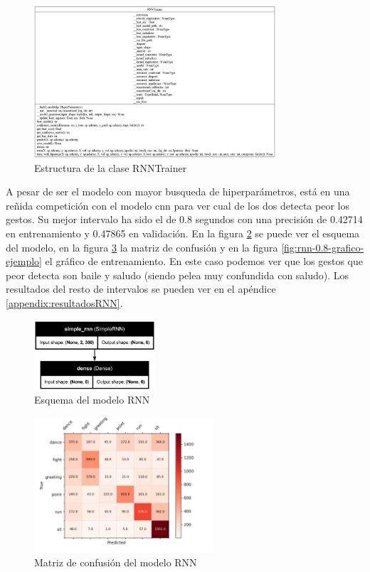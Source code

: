 \begin{figure}[H]
    \centering
    \includegraphics[width=0.8\textwidth]{Imagenes/Bitmap/classes_RNNTrainer.png}
    \caption{Estructura de la clase RNNTrainer}
    \label{fig:rnn-estructura}
\end{figure}

A pesar de ser el modelo con mayor busqueda de hiperparámetros, está en una reñida competición con el modelo \gls{cnn} para ver cual de los dos detecta peor los gestos. Su mejor intervalo ha sido el de 0.8 segundos con una precisión de 0.42714 en entrenamiento y 0.47865 en validación. En la figura \ref{fig:rnn-0.8-ejemplo} se puede ver el esquema del modelo, en la figura \ref{fig:rnn-0.8-matriz-ejemplo} la matriz de confusión y en la figura \ref{fig:rnn-0.8-grafico-ejemplo} el gráfico de entrenamiento. En este caso podemos ver que los gestos que peor detecta son baile y saludo (siendo pelea muy confundida con saludo). Los resultados del resto de intervalos se pueden ver en el apéndice \ref{appendix:resultadosRNN}.

\begin{figure}[H]
    \centering
    \includegraphics[width=0.4\textwidth]{Imagenes/Bitmap/best-rnn0.8.png}
    \caption{Esquema del modelo RNN}
    \label{fig:rnn-0.8-ejemplo}
\end{figure}

\begin{figure}[H]
    \centering
    \includegraphics[width=0.6\textwidth]{Imagenes/Bitmap/CM_best-rnn0.8.png}
    \caption{Matriz de confusión del modelo RNN}
    \label{fig:rnn-0.8-matriz-ejemplo}
\end{figure}

